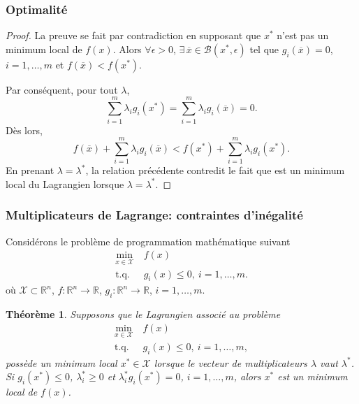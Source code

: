 \documentclass[usepdftitle=false]{beamer}
\newtheorem{thm}{Théorème}
\def\cB{\mathcal{B}}
\def\cX{\mathcal{X}}
\def\RR{\mathbb{R}}
\begin{document}
\begin{frame}
\frametitle{Optimalité}

\begin{proof}
	La preuve se fait par contradiction en supposant que $x^*$ n'est pas un minimum local de $f(x)$.
	Alors $\forall \epsilon > 0$, $\exists\, \overline{x} \in \cB(x^*, \epsilon)$ tel que $g_i(\overline{x}) = 0$, $i = 1,\ldots,m$ et $f(\overline{x}) < f(x^*)$.
	
Par conséquent, pour tout $\lambda$,
	$$
	\sum_{i = 1}^{m} \lambda_i g_i(x^*) = \sum_{i = 1}^{m} \lambda_i g_i(\overline{x}) = 0.
	$$
	Dès lors,
$$
f(\overline{x}) + \sum_{i = 1}^{m} \lambda_i g_i(\overline{x}) < f(x^*) + \sum_{i = 1}^{m} \lambda_i g_i(x^*).
$$
En prenant $\lambda = \lambda^*$, la relation précédente contredit le fait que est un
minimum local du Lagrangien lorsque $\lambda = \lambda^*$.
\end{proof}

\end{frame}

\begin{frame}
\frametitle{Multiplicateurs de Lagrange: contraintes d'inégalité}

Considérons le problème de programmation mathématique suivant
\begin{align*}
\min_{x \in \cX} \ & f(x) \\
\mbox{t.q. } & g_i(x) \leq 0,\ i = 1,\ldots,m.
\end{align*}
où $\cX \subset \RR^n$, $f: \RR^n \rightarrow \RR$, $g_i: \RR^n \rightarrow \RR$, $i = 1,\ldots,m$.

\mbox{}

\begin{thm}
Supposons que le Lagrangien associé au problème
\begin{align*}
\min_{x \in \cX} \ & f(x) \\
\mbox{t.q. } & g_i(x) \leq 0,\ i = 1,\ldots,m,
\end{align*}
possède un minimum local $x^* \in \cX$ lorsque le vecteur de multiplicateurs $\lambda$ vaut $\lambda^*$.
Si $g_i(x^*) \leq 0$, $\lambda^*_i \geq 0$ et $\lambda^*_i g_i(x^*) = 0$, $i = 1,\ldots,m$, alors $x^*$ est un minimum local de $f(x)$.
\end{thm}

\end{frame}
\end{document}
